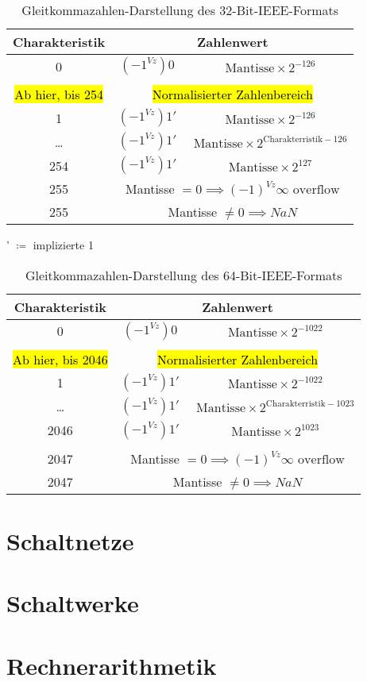 \documentclass[a4paper]{scrartcl}
\begin{document}
	\begin{table}[h]
		\centering
		\begin{tabular}{|c|c|c|}
			\hline
			Charakteristik& \multicolumn{2}{c|}{Zahlenwert} \\ \hline
			0&\((-1^{Vz})0\) & \( \text{ Mantisse} \times 2^{-126}\) \\ 
			\\
			 \hl{Ab hier, bis 254}& \multicolumn{2}{c|}{\hl{Normalisierter Zahlenbereich}}\\
			1& \((-1^{Vz})1' \) & \( \text{ Mantisse} \times 2^{-126} \)\\
			\dots & \((-1^{Vz})1'\) &\( \text{ Mantisse} \times 2^{\text{Charakterristik}-126}\)\\
			254& \((-1^{Vz})1'\) & \( \text{ Mantisse} \times 2^{127}\)\\ \hline
			255&\multicolumn{2}{c|}{Mantisse \( = 0  \implies (-1)^{Vz} \infty \text{ overflow} \) }\\
			255&\multicolumn{2}{c|}{Mantisse \( \neq 0  \implies NaN \)} \\
			\hline
		\end{tabular}
		\caption{Gleitkommazahlen-Darstellung des 32-Bit-IEEE-Formats}
	\end{table}
	 ' \( \coloneqq \) implizierte 1\\
	 
	 \begin{table}[h]
	 	\centering
	 	\begin{tabular}{|c|c|c|}
	 		\hline
	 		Charakteristik& \multicolumn{2}{c|}{Zahlenwert} \\ \hline
	 		0&\((-1^{Vz})0\) & \( \text{ Mantisse} \times 2^{-1022}\) \\ 
	 		\\
	 		\hl{Ab hier, bis 2046}& \multicolumn{2}{c|}{\hl{Normalisierter Zahlenbereich}}\\
	 		1& \((-1^{Vz})1' \) & \( \text{ Mantisse} \times 2^{-1022} \)\\
	 		\dots & \((-1^{Vz})1'\) &\( \text{ Mantisse} \times 2^{\text{Charakterristik}-1023}\)\\
	 		2046& \((-1^{Vz})1'\) & \( \text{ Mantisse} \times 2^{1023}\)
	 		\\ \hline\\
	 		2047&\multicolumn{2}{c|}{Mantisse \( = 0  \implies (-1)^{Vz} \infty \text{ overflow} \) }\\
	 		2047&\multicolumn{2}{c|}{Mantisse \( \neq 0  \implies NaN \)} \\
	 		\hline
	 	\end{tabular}
	 	\caption{Gleitkommazahlen-Darstellung des 64-Bit-IEEE-Formats}
	 \end{table}
							
	\section{Schaltnetze}
	\section{Schaltwerke}
	\section{Rechnerarithmetik}
	
\end{document}
